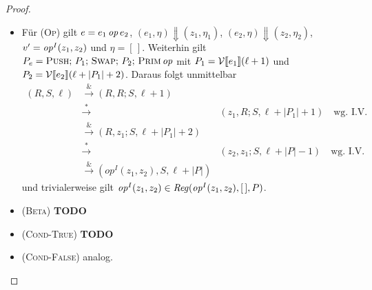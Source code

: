\documentclass[12pt,fleqn]{article}
\newcommand{\RN}[1]{\mbox{\textsc{(#1)}}}
\begin{document}
\begin{proof}
\begin{itemize}
  \item F\"ur \RN{Op} gilt $e = e_1\,{\text{\it op\/}}\,e_2$, $(e_1,\eta) \Downarrow (z_1,\eta_1)$,
    $(e_2,\eta) \Downarrow (z_2,\eta_2)$,
    $v' = {\text{\it op\/}}^I(z_1,z_2)$ und $\eta = [\,]$. Weiterhin gilt
    $P_e = \textsc{Push};\,P_1;\,\textsc{Swap};\,P_2;\,\textsc{Prim}\,{\text{\it op\/}}$ mit
    $P_1=\mathcal{V}\llbracket e_1 \rrbracket(\ell+1)$ und $P_2=\mathcal{V}\llbracket e_2 \rrbracket(\ell+|P_1|+2)$. Daraus folgt unmittelbar
    \[\begin{array}{rcl}
      (R,S,\ell)
      &\xrightarrow& (R,R;S,\ell+1) \\
      &\xrightarrow*& (z_1,R;S,\ell+|P_1|+1) \quad \text{wg. I.V.} \\
      &\xrightarrow& (R,z_1;S,\ell+|P_1|+2) \\
      &\xrightarrow*& (z_2,z_1;S,\ell+|P|-1) \quad \text{wg. I.V.} \\
      &\xrightarrow& (op^I(z_1,z_2),S,\ell+|P|)
    \end{array}\]
    und trivialerweise gilt ${\text{\it op\/}}^I(z_1,z_2) \in {\text{\it Reg\/}}({\text{\it op\/}}^I(z_1,z_2),[\,],P)$.

  \item \RN{Beta} {\bf TODO}

  \item \RN{Cond-True} {\bf TODO}
    
  \item \RN{Cond-False} analog.
  \end{itemize}
\end{proof}
\end{document}

